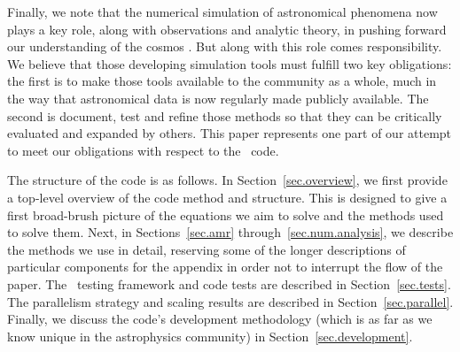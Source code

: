 Finally, we note that the numerical simulation of astronomical phenomena now plays a key role, along with observations and analytic theory, in pushing forward our understanding of the cosmos \citep[e.g.,][]{DecadalSurvey01, DecadalSurvey10}.   But along with this role comes responsibility.  We believe that those developing simulation tools must fulfill two key obligations: the first is to make those tools available to the community as a whole, much in the way that astronomical data is now regularly made publicly available.  The second is document, test and refine those methods so that they can be critically evaluated and expanded by others.  This paper represents one part of our attempt to meet our obligations with respect to the \enzo\ code.

The structure of the code is as follows.  In Section~\ref{sec.overview}, we first provide a top-level overview of the code method and structure.  This is designed to give a first broad-brush picture of the equations we aim to solve and the methods used to solve them.  Next, in Sections~\ref{sec.amr} through~\ref{sec.num.analysis}, we describe the methods we use in detail, reserving some of the longer descriptions of particular components for the appendix in order not to interrupt the flow of the paper.  The \enzo\ testing framework and code tests are described in Section~\ref{sec.tests}.  The parallelism strategy and scaling results are described in Section~\ref{sec.parallel}.  Finally, we discuss the code's development methodology (which is as far as we know unique in the astrophysics community) in Section~\ref{sec.development}.

